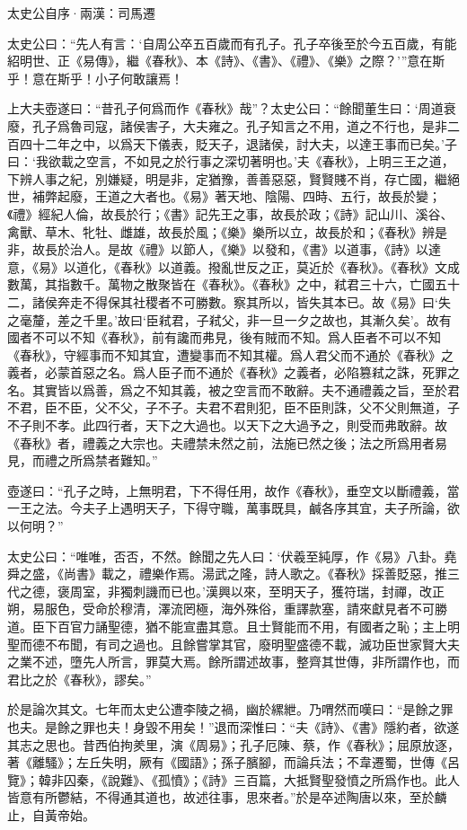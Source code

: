 \documentclass[12pt,a4paper]{ctexbook}
\begin{document}
太史公自序·兩漢：司馬遷 \par
太史公曰：“先人有言：‘自周公卒五百歲而有孔子。孔子卒後至於今五百歲，有能紹明世、正《易傳》，繼《春秋》、本《詩》、《書》、《禮》、《樂》之際？’”意在斯乎！意在斯乎！小子何敢讓焉！\par
上大夫壺遂曰：“昔孔子何爲而作《春秋》哉”？太史公曰：“餘聞董生曰：‘周道衰廢，孔子爲魯司寇，諸侯害子，大夫雍之。孔子知言之不用，道之不行也，是非二百四十二年之中，以爲天下儀表，貶天子，退諸侯，討大夫，以達王事而已矣。’子曰：‘我欲載之空言，不如見之於行事之深切著明也。’夫《春秋》，上明三王之道，下辨人事之紀，別嫌疑，明是非，定猶豫，善善惡惡，賢賢賤不肖，存亡國，繼絕世，補弊起廢，王道之大者也。《易》著天地、陰陽、四時、五行，故長於變；《禮》經紀人倫，故長於行；《書》記先王之事，故長於政；《詩》記山川、溪谷、禽獸、草木、牝牡、雌雄，故長於風；《樂》樂所以立，故長於和；《春秋》辨是非，故長於治人。是故《禮》以節人，《樂》以發和，《書》以道事，《詩》以達意，《易》以道化，《春秋》以道義。撥亂世反之正，莫近於《春秋》。《春秋》文成數萬，其指數千。萬物之散聚皆在《春秋》。《春秋》之中，弒君三十六，亡國五十二，諸侯奔走不得保其社稷者不可勝數。察其所以，皆失其本已。故《易》曰‘失之毫釐，差之千里。’故曰‘臣弒君，子弒父，非一旦一夕之故也，其漸久矣’。故有國者不可以不知《春秋》，前有讒而弗見，後有賊而不知。爲人臣者不可以不知《春秋》，守經事而不知其宜，遭變事而不知其權。爲人君父而不通於《春秋》之義者，必蒙首惡之名。爲人臣子而不通於《春秋》之義者，必陷篡弒之誅，死罪之名。其實皆以爲善，爲之不知其義，被之空言而不敢辭。夫不通禮義之旨，至於君不君，臣不臣，父不父，子不子。夫君不君則犯，臣不臣則誅，父不父則無道，子不子則不孝。此四行者，天下之大過也。以天下之大過予之，則受而弗敢辭。故《春秋》者，禮義之大宗也。夫禮禁未然之前，法施已然之後；法之所爲用者易見，而禮之所爲禁者難知。”\par
壺遂曰：“孔子之時，上無明君，下不得任用，故作《春秋》，垂空文以斷禮義，當一王之法。今夫子上遇明天子，下得守職，萬事既具，鹹各序其宜，夫子所論，欲以何明？”\par
太史公曰：“唯唯，否否，不然。餘聞之先人曰：‘伏羲至純厚，作《易》八卦。堯舜之盛，《尚書》載之，禮樂作焉。湯武之隆，詩人歌之。《春秋》採善貶惡，推三代之德，褒周室，非獨刺譏而已也。’漢興以來，至明天子，獲符瑞，封禪，改正朔，易服色，受命於穆清，澤流罔極，海外殊俗，重譯款塞，請來獻見者不可勝道。臣下百官力誦聖德，猶不能宣盡其意。且士賢能而不用，有國者之恥；主上明聖而德不布聞，有司之過也。且餘嘗掌其官，廢明聖盛德不載，滅功臣世家賢大夫之業不述，墮先人所言，罪莫大焉。餘所謂述故事，整齊其世傳，非所謂作也，而君比之於《春秋》，謬矣。”\par
於是論次其文。七年而太史公遭李陵之禍，幽於縲紲。乃喟然而嘆曰：“是餘之罪也夫。是餘之罪也夫！身毀不用矣！”退而深惟曰：“夫《詩》、《書》隱約者，欲遂其志之思也。昔西伯拘羑里，演《周易》；孔子厄陳、蔡，作《春秋》；屈原放逐，著《離騷》；左丘失明，厥有《國語》；孫子臏腳，而論兵法；不韋遷蜀，世傳《呂覽》；韓非囚秦，《說難》、《孤憤》；《詩》三百篇，大抵賢聖發憤之所爲作也。此人皆意有所鬱結，不得通其道也，故述往事，思來者。”於是卒述陶唐以來，至於麟止，自黃帝始。\par
\end{document}
